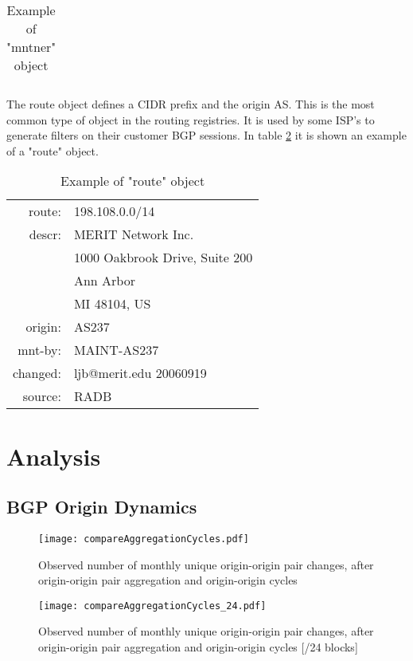 \documentclass[11pt,a4paper]{scrreprt}
\begin{document}
\begin{appendices}
\begin{table}[!h]
\begin{tabular}{  r  l  }
\end{tabular}
\caption{Example of "mntner" object}
\label{table:5}
\end{table}

The route object defines a CIDR prefix and the origin AS. This is the most common type of object in the routing registries. It is used by some ISP's to generate filters on their customer BGP sessions. In table \ref{table:6} it is shown an example of a "route" object. 	

\begin{table}[!h]
\centering
\begin{tabular}{  r  l  }

route:   	&      198.108.0.0/14\\
descr:    	&      MERIT Network Inc.\\
			&		1000 Oakbrook Drive, Suite 200\\ 
 			&		Ann Arbor \\
 			&		MI 48104, US\\
origin:    	&      AS237\\
mnt-by:    	&      MAINT-AS237\\
changed:   	&      ljb@merit.edu 20060919\\
source:   	&      RADB\\

\end{tabular}
\caption{Example of "route" object}
\label{table:6}
\end{table}

\chapter{Analysis}

\section{BGP Origin Dynamics}

\begin{figure}[!h]
\centering
\texttt{[image: compareAggregationCycles.pdf]}
\caption{Observed number of monthly
unique origin-origin pair changes, after origin-origin pair aggregation and origin-origin cycles}
\label{fig:compareAggregationCycles}
\end{figure}


\begin{figure}[!h]
\centering
\texttt{[image: compareAggregationCycles\_24.pdf]}
\caption{Observed number of monthly
unique origin-origin pair changes, after origin-origin pair aggregation and origin-origin cycles [/24 blocks]}
\label{fig:compareAggregationCycles24}
\end{figure}


\end{appendices}
\end{document}
